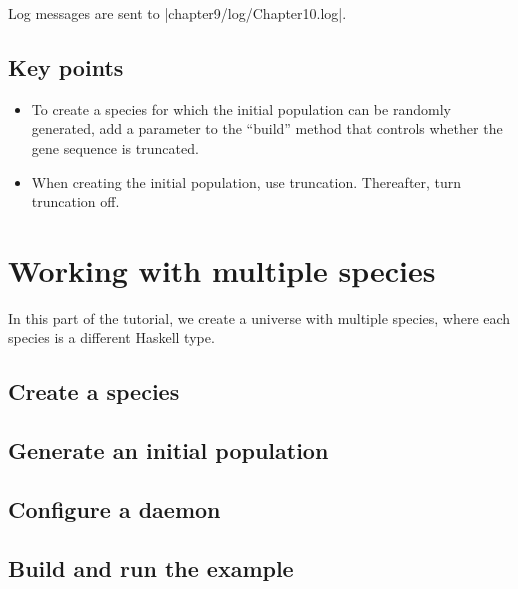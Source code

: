 \documentclass[a4paper,10pt]{report}
\begin{document}
Log messages are sent to |chapter9/log/Chapter10.log|.

\section{Key points}

\begin{itemize}
\item To create a species for which the initial population can be randomly generated,
add a parameter to the ``build'' method that controls whether the gene sequence is truncated.
\item When creating the initial population, use truncation.
Thereafter, turn truncation off.
\end{itemize}

\chapter{Working with multiple species}
\label{sec:multiple}

In this part of the tutorial, we create a universe with multiple species,
where each species is a different Haskell type.

\section{Create a species}
\label{sec:species5}






\section{Generate an initial population}
\label{sec:pop5}



\section{Configure a daemon}
\label{sec:daemon5}



\section{Build and run the example}
\label{sec:run5}
\end{document}
